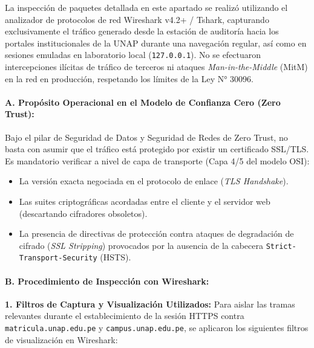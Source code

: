 \begin{tcolorbox}[
    colback=orange!8!white,
    colframe=orange!85!black,
    arc=2mm,
    boxrule=0.9pt,
    title={\textbf{NOTA METODOLÓGICA DE AUDITORÍA DEFENSIVA}},
    fonttitle=\small\sffamily\bfseries,
    coltitle=white
]
\small
La inspección de paquetes detallada en este apartado se realizó utilizando el analizador de protocolos de red Wireshark v4.2+ / Tshark, capturando exclusivamente el tráfico generado desde la estación de auditoría hacia los portales institucionales de la UNAP durante una navegación regular, así como en sesiones emuladas en laboratorio local (\texttt{127.0.0.1}). No se efectuaron intercepciones ilícitas de tráfico de terceros ni ataques \textit{Man-in-the-Middle} (MitM) en la red en producción, respetando los límites de la Ley N° 30096.
\end{tcolorbox}

\paragraph{A. Propósito Operacional en el Modelo de Confianza Cero (Zero Trust):}
Bajo el pilar de Seguridad de Datos y Seguridad de Redes de Zero Trust, no basta con asumir que el tráfico está protegido por existir un certificado SSL/TLS. Es mandatorio verificar a nivel de capa de transporte (Capa 4/5 del modelo OSI):
\begin{itemize}
    \item La versión exacta negociada en el protocolo de enlace (\textit{TLS Handshake}).
    \item Las suites criptográficas acordadas entre el cliente y el servidor web (descartando cifradores obsoletos).
    \item La presencia de directivas de protección contra ataques de degradación de cifrado (\textit{SSL Stripping}) provocados por la ausencia de la cabecera \texttt{Strict-Transport-Security} (HSTS).
\end{itemize}

\paragraph{B. Procedimiento de Inspección con Wireshark:}

\textbf{1. Filtros de Captura y Visualización Utilizados:} Para aislar las tramas relevantes durante el establecimiento de la sesión HTTPS contra \texttt{matricula.unap.edu.pe} y \texttt{campus.unap.edu.pe}, se aplicaron los siguientes filtros de visualización en Wireshark:

